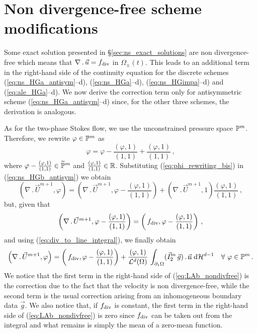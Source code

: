 \section{Non divergence-free scheme modifications}
Some exact solution presented in \S\ref{sec:ns_exact_solutions} are non
divergence-free which means that $\nabla\,.\,\vec u = f_{\rm{div}}$ in
$\Omega_\pm(t)$. This leads to an additional term in the right-hand side of the
continuity equation for the discrete schemes (\ref{eq:ns_HGa_antisym}--d),
(\ref{eq:ns_HGa}--d), (\ref{eq:ns_HGimpa}--d) and (\ref{eq:ale_HGa}--d). We
now derive the correction term only for antisymmetric scheme
(\ref{eq:ns_HGa_antisym}--d) since, for the other three schemes, the
derivation is analogous.

As for the two-phase Stokes flow, we use the unconstrained pressure space
$\mathbb{P}^m$. Therefore, we rewrite $\varphi\in \mathbb{P}^m$ as
\begin{equation}\label{eq:phi_rewriting_bis}
\varphi=\varphi-\frac{\left(\varphi,1\right)}{\left(1,1\right)}
+\frac{\left(\varphi,1\right)}{\left(1,1\right)}\,,
\end{equation}
where $\varphi-\frac{(\varphi,1)}{(1,1)}\in\widetilde{\mathbb{P}}^m$ and
$\frac{(\varphi,1)}{(1,1)}\in\mathbb R$. Substituting (\ref{eq:phi_rewriting_bis}) in
(\ref{eq:ns_HGb_antisym}) we obtain
\begin{equation}
\left(\nabla\,.\,\vec U^{m+1}, \varphi\right)  =
\left(\nabla\,.\,\vec U^{m+1},
\varphi-\frac{\left(\varphi,1\right)}{\left(1,1\right)}\right) +
\left(\nabla\,.\,\vec U^{m+1},1\right)
\frac{\left(\varphi,1\right)}{\left(1,1\right)}\,,
\end{equation}
but, given that
\begin{equation}
\left(\nabla\,.\,\vec U^{m+1},
\varphi-\frac{\left(\varphi,1\right)}{\left(1,1\right)}\right) =
\left(\,f_{\rm{div}},
\varphi-\frac{\left(\varphi,1\right)}{\left(1,1\right)}\right)\,,
\end{equation}
and using (\ref{eq:div_to_line_integral}), we finally obtain
\begin{equation}\label{eq:LAb_nondivfree}
\left(\nabla\,.\,\vec U^{m+1}, \varphi\right) =
\left(\,f_{\rm{div}},
\varphi-\frac{\left(\varphi,1\right)}{\left(1,1\right)}\right)+
\frac{\left(\varphi, 1\right)}{\mathcal{L}^d(\Omega)}\, \int_{\partial_1\Omega}
(\vec I^m_2\,\vec g) \,.\, \vec{\rm n} \;{\rm d}{\cal H}^{d-1} \quad \forall\ \varphi \in
\mathbb{P}^m\,.
\end{equation}
We notice that the first term in the right-hand side of
(\ref{eq:LAb_nondivfree}) is the correction due to the fact that the velocity is
non divergence-free, while the second term is the usual correction arising
from an inhomogeneous boundary data $\vec g$. We also notice that, if
$f_{\rm{div}}$ is constant, the first term in the right-hand side of
(\ref{eq:LAb_nondivfree}) is zero since $f_{\rm{div}}$ can be taken out
from the integral and what remains is simply the mean of a zero-mean function.

